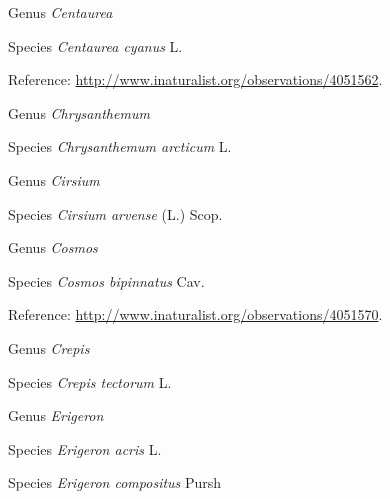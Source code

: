 \documentclass[9pt, article]{memoir}
\begin{document}
\begin{multicols}{2}
\vspace{6pt}\noindent\hspace{30pt}Genus \textit{Centaurea}


\vspace{6pt}\noindent\hspace{36pt}Species \textit{Centaurea cyanus} L.


\vspace{6pt}Reference: 
\url{http://www.inaturalist.org/observations/4051562}.

\vspace{6pt}\noindent\hspace{30pt}Genus \textit{Chrysanthemum}


\vspace{6pt}\noindent\hspace{36pt}Species \textit{Chrysanthemum arcticum} L.


\vspace{6pt}\noindent\hspace{30pt}Genus \textit{Cirsium}


\vspace{6pt}\noindent\hspace{36pt}Species \textit{Cirsium arvense} (L.) Scop.


\vspace{6pt}\noindent\hspace{30pt}Genus \textit{Cosmos}


\vspace{6pt}\noindent\hspace{36pt}Species \textit{Cosmos bipinnatus} Cav.


\vspace{6pt}Reference: 
\url{http://www.inaturalist.org/observations/4051570}.

\vspace{6pt}\noindent\hspace{30pt}Genus \textit{Crepis}


\vspace{6pt}\noindent\hspace{36pt}Species \textit{Crepis tectorum} L.


\vspace{6pt}\noindent\hspace{30pt}Genus \textit{Erigeron}


\vspace{6pt}\noindent\hspace{36pt}Species \textit{Erigeron acris} L.


\vspace{6pt}\noindent\hspace{36pt}Species \textit{Erigeron compositus} Pursh



\end{multicols}
\end{document}
